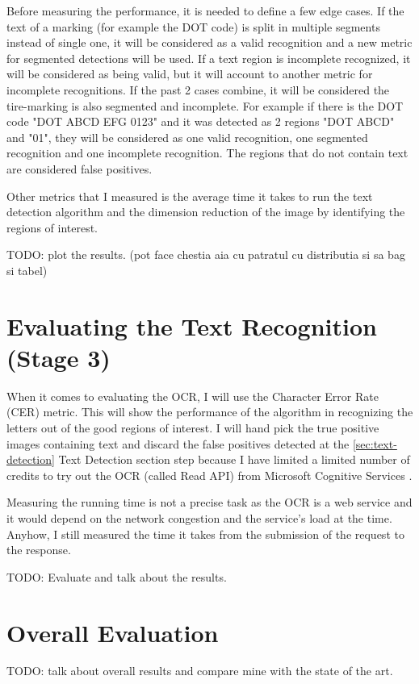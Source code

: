 Before measuring the performance, it is needed to define a few edge cases. If the text of a marking (for example the DOT code) is split in multiple segments instead of single one, it will be considered as a valid recognition and a new metric for segmented detections will be used. If a text region is incomplete recognized, it will be considered as being valid, but it will account to another metric for incomplete recognitions. If the past 2 cases combine, it will be considered the tire-marking is also segmented and incomplete. For example if there is the DOT code "DOT ABCD EFG 0123" and it was detected as 2 regions "DOT ABCD" and "01", they will be considered as one valid recognition, one segmented recognition and one incomplete recognition. The regions that do not contain text are considered false positives.

Other metrics that I measured is the average time it takes to run the text detection algorithm and the dimension reduction of the image by identifying the regions of interest.

TODO: plot the results. (pot face chestia aia cu patratul cu distributia si sa bag si tabel)

\section{Evaluating the Text Recognition (Stage 3)}\label{section:evaluation-ocr}

When it comes to evaluating the OCR, I will use the Character Error Rate (CER) \cite{site:evaluation-OCR-character_error_rate} metric. This will show the performance of the algorithm in recognizing the letters out of the good regions of interest. I will hand pick the true positive images containing text and discard the false positives detected at the \ref{sec:text-detection} Text Detection section step because I have limited a limited number of credits to try out the OCR (called Read API) from Microsoft Cognitive Services \cite{site:Microsoft_Cognitive_Services}.

Measuring the running time is not a precise task as the OCR is a web service and it would depend on the network congestion and the service's load at the time. Anyhow, I still measured the time it takes from the submission of the request to the response.

TODO: Evaluate and talk about the results.

\section{Overall Evaluation}\label{section:evaluation-overall}

TODO: talk about overall results and compare mine with the state of the art.
